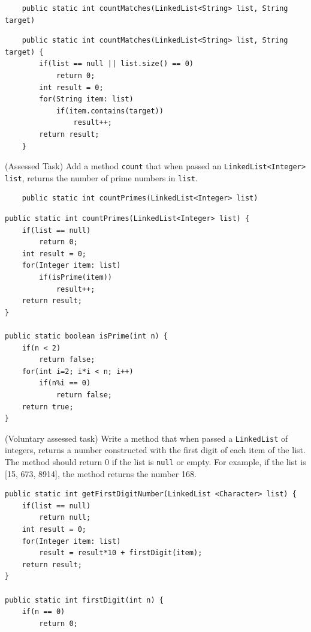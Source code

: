 \begin{questions}
\begin{lstlisting}
	public static int countMatches(LinkedList<String> list, String target)
\end{lstlisting}

\begin{solution}
\begin{lstlisting}
	public static int countMatches(LinkedList<String> list, String target) {
		if(list == null || list.size() == 0) 
			return 0;
		int result = 0;
		for(String item: list)
			if(item.contains(target))			
				result++;
		return result;
	}	
\end{lstlisting}	
\end{solution}

\question (Assessed Task) Add a method \texttt{count} that when passed an \texttt{LinkedList<Integer> list}, returns the number of prime numbers in \texttt{list}.

\begin{lstlisting}
	public static int countPrimes(LinkedList<Integer> list)
\end{lstlisting}

\begin{solution}
\begin{lstlisting}
public static int countPrimes(LinkedList<Integer> list) {
	if(list == null)
		return 0;
	int result = 0;
	for(Integer item: list)
		if(isPrime(item))
			result++;
	return result;
}

public static boolean isPrime(int n) {
	if(n < 2)
		return false;
	for(int i=2; i*i < n; i++)
		if(n%i == 0)
			return false;
	return true;
}
\end{lstlisting}
\end{solution}

\question (Voluntary assessed task) Write a method that when passed a \texttt{LinkedList} of integers, returns a number constructed with the first digit of each item of the list. The method should return 0 if the list is \texttt{null} or empty. For example, if the list is [15, 673, 8914], the method returns the number 168.

\begin{solution}
\begin{lstlisting}
public static int getFirstDigitNumber(LinkedList <Character> list) {
	if(list == null) 
		return null;
	int result = 0;
	for(Integer item: list)
		result = result*10 + firstDigit(item);
	return result;
}	

public static int firstDigit(int n) {
	if(n == 0)
		return 0;
		

\end{lstlisting}
\end{solution}
\end{questions}
